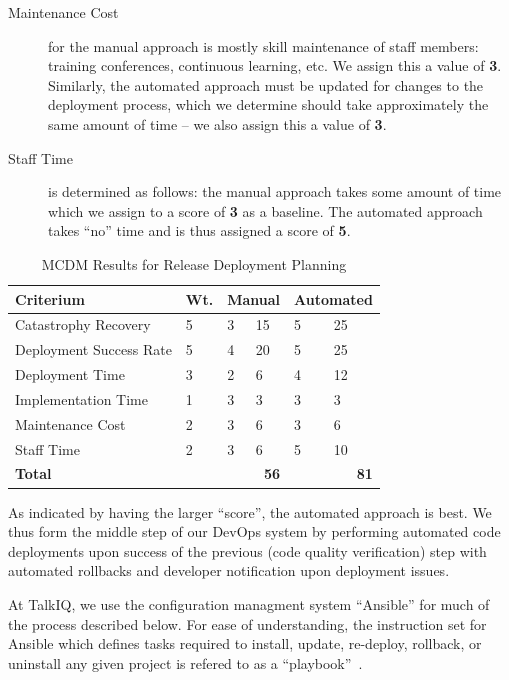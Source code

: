 \documentclass[12pt]{article}
\begin{document}
\begin{description}
\item[Maintenance Cost] for the manual approach is mostly skill maintenance of staff members: training conferences, continuous learning, etc. We assign this a value of {\bf 3}. Similarly, the automated approach must be updated for changes to the deployment process, which we determine should take approximately the same amount of time -- we also assign this a value of {\bf 3}.
\item[Staff Time] is determined as follows: the manual approach takes some amount of time which we assign to a score of {\bf 3} as a baseline. The automated approach takes ``no'' time and is thus assigned a score of {\bf 5}.
\end{description}

\begin{table}[ht]
\caption{MCDM Results for Release Deployment Planning}
\label{tbl:mcdm-rdp}
\centering
\begin{tabular}{|p{5.0cm}|p{0.65cm}|p{0.5cm}|p{0.5cm}|p{0.8cm}|p{0.8cm}|}
    \hline
    {\bf Criterium} & {\bf Wt.} & \multicolumn{2}{|p{1cm}|}{{\bf Manual}} & \multicolumn{2}{|p{1.6cm}|}{{\bf \mbox{Automated}}} \\
    \hline
    \hline
    Catastrophy Recovery    &  5 & 3 & 15 & 5 & 25 \\
    Deployment Success Rate &  5 & 4 & 20 & 5 & 25 \\
    Deployment Time         &  3 & 2 &  6 & 4 & 12 \\
    Implementation Time     &  1 & 3 &  3 & 3 &  3 \\
    Maintenance Cost        &  2 & 3 &  6 & 3 &  6 \\
    Staff Time              &  2 & 3 &  6 & 5 & 10 \\
    \hline
    \hline
    {\bf Total}             &    & \multicolumn{2}{|r|}{{\bf 56}} & \multicolumn{2}{|r|}{{\bf 81}} \\
    \hline
\end{tabular}
\end{table}

As indicated by having the larger ``score'', the automated approach is best. We thus form the middle step of our DevOps system by performing automated code deployments upon success of the previous (code quality verification) step with automated rollbacks and developer notification upon deployment issues.

At TalkIQ, we use the configuration managment system ``Ansible'' for much of the process described below. For ease of understanding, the instruction set for Ansible which defines tasks required to install, update, re-deploy, rollback, or uninstall any given project is refered to as a ``playbook''~\cite{playbooks}.
\end{document}
